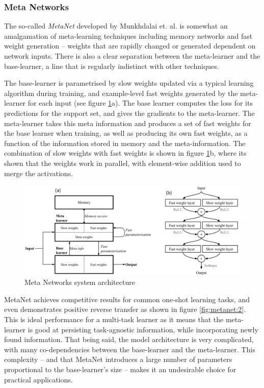 \documentclass{report}
\begin{document}
\subsubsection{Meta Networks}
The so-called \emph{MetaNet} developed by Munkhdalai et. al. \parencite{mn} is somewhat an amalgamation of meta-learning techniques including memory networks and fast weight generation -- weights that are rapidly changed or generated dependent on network inputs. There is also a clear separation between the meta-learner and the base-learner, a line that is regularly indistinct with other techniques. \par
The base-learner is parametrised by slow weights updated via a typical learning algorithm during training, and example-level fast weights generated by the meta-learner for each input (see figure \ref{fig:metanet:1}a). The base learner computes the loss for its predictions for the support set, and gives the gradients to the meta-learner. The meta-learner takes this meta information and produces a set of fast weights for the base learner when training, as well as producing its own fast weights, as a function of the information stored in memory and the meta-information. The combination of slow weights with fast weights is shown in figure \ref{fig:metanet:1}b, where its shown that the weights work in parallel, with element-wise addition used to merge the activations. \par
\begin{figure}[h]
 \centering
 \includegraphics[width=15cm]{metanet1}
 \caption{Meta Networks system architecture}
 \label{fig:metanet:1}
\end{figure}
MetaNet achieves competitive results for common one-shot learning tasks, and even demonstrates positive reverse transfer as shown in figure \ref{fig:metanet:2}. This is ideal performance for a multi-task learner as it means that the meta-learner is good at persisting task-agnostic information, while incorporating newly found information. That being said, the model architecture is very complicated, with many co-dependencies between the base-learner and the meta-learner. This complexity -- and that MetaNet introduces a large number of parameters proportional to the base-learner's size -- makes it an undesirable choice for practical applications.  \newline \newline
\end{document}
